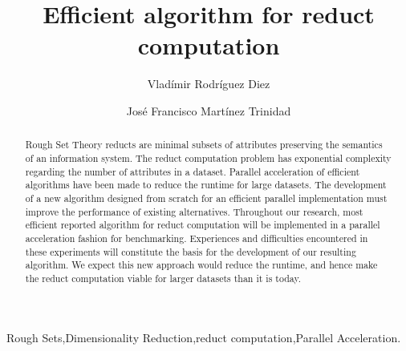 \documentclass[authoryear,11pt]{elsarticle}
\begin{document}
\begin{frontmatter}
	
	\title{Efficient algorithm for reduct computation}
	
	\author{Vlad\'imir Rodr\'iguez Diez}
	\author{Jos\'e Francisco Mart\'inez Trinidad}
	
	\address{Computer Science Department\\National Institute of
	Astrophysics, Optics and Electronics\\
	Luis Enrique Erro \# 1, Santa Mar\'{\i}a Tonantzintla, Puebla,
	72840, M\'{e}xico} 
	
	
	
	\begin{abstract}
	    Rough Set Theory reducts are minimal subsets of attributes preserving the semantics of an 
	    information system. The reduct computation problem has exponential complexity regarding the number of 
	    attributes in a dataset. Parallel acceleration of efficient algorithms have been made to
	    reduce the runtime for large datasets. The development of a new algorithm designed from scratch
	    for an efficient parallel implementation must improve the performance of existing alternatives. 
	    Throughout our research, most efficient reported algorithm for reduct computation will be 
	    implemented in a parallel acceleration fashion for benchmarking. Experiences and difficulties 
	    encountered in these experiments will constitute the basis for the development of our resulting algorithm. 
	    We expect this new approach would reduce the runtime, and hence make the reduct computation viable for 
	    larger datasets than it is today.
	\end{abstract}
	
	\begin{keyword}
		Rough Sets\sep Dimensionality Reduction\sep reduct computation\sep Parallel Acceleration.
	\end{keyword}
	
\end{frontmatter}

\pagebreak 
\tableofcontents
\pagebreak 

\end{document}
